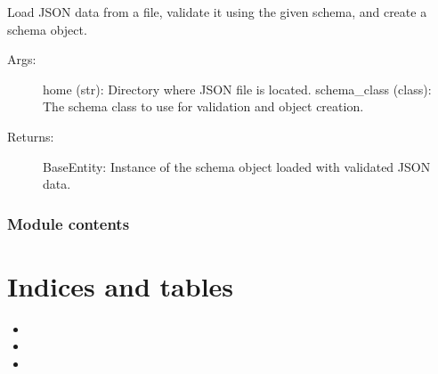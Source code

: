 \documentclass[letterpaper,10pt,english]{sphinxmanual}
\begin{document}

\begin{fulllineitems}
\label{\detokenize{eda_schema:eda_schema.json_utils.load_json}}
\pysigstartsignatures
{}
\pysigstopsignatures
\sphinxAtStartPar
Load JSON data from a file, validate it using the given schema, and create a schema object.
\begin{description}
\item[{Args:}] \leavevmode
\sphinxAtStartPar
home (str): Directory where JSON file is located.
schema\_class (class): The schema class to use for validation and object creation.

\item[{Returns:}] \leavevmode
\sphinxAtStartPar
BaseEntity: Instance of the schema object loaded with validated JSON data.

\end{description}

\end{fulllineitems}



\subsection{Module contents}
\label{\detokenize{eda_schema:module-eda_schema}}\label{\detokenize{eda_schema:module-contents}}

\chapter{Indices and tables}
\label{\detokenize{index:indices-and-tables}}\begin{itemize}
\item {} 
\sphinxAtStartPar
{}

\item {} 
\sphinxAtStartPar
{}

\item {} 
\sphinxAtStartPar
{}

\end{itemize}
\end{document}
